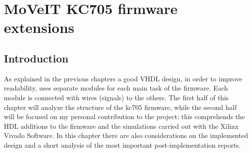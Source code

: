\chapter{MoVeIT KC705 firmware extensions}
\section{Introduction}
\noindent As explained in the previous chapters a good VHDL design, in order to improve readability, uses separate modules for each main task of the firmware. Each module is connected with wires (signals) to the others. The first half of this chapter will analyze the structure of the kc705 firmware, while the second half will be focused on my personal contribution to the project; this comprehends the HDL additions to the firmware and the simulations carried out with the Xilinx Vivado Software.
In this chapter there are also considerations on the implemented design and a short analysis of the most important post-implementation reports. 

